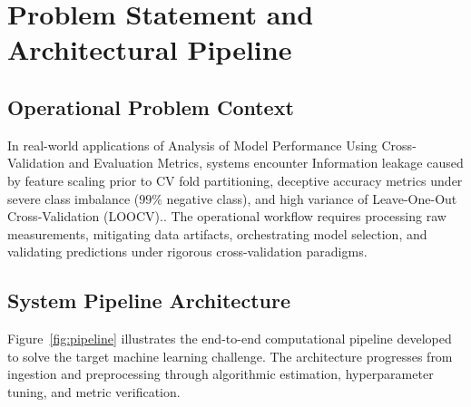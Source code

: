 \section{Problem Statement and Architectural Pipeline}

\subsection{Operational Problem Context}
In real-world applications of Analysis of Model Performance Using Cross-Validation and Evaluation Metrics, systems encounter Information leakage caused by feature scaling prior to CV fold partitioning, deceptive accuracy metrics under severe class imbalance ($99\%$ negative class), and high variance of Leave-One-Out Cross-Validation (LOOCV).. The operational workflow requires processing raw measurements, mitigating data artifacts, orchestrating model selection, and validating predictions under rigorous cross-validation paradigms.

\subsection{System Pipeline Architecture}
Figure~\ref{fig:pipeline} illustrates the end-to-end computational pipeline developed to solve the target machine learning challenge. The architecture progresses from ingestion and preprocessing through algorithmic estimation, hyperparameter tuning, and metric verification.

